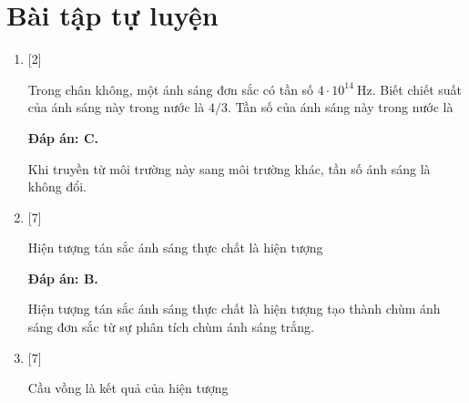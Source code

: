\section{Bài tập tự luyện}
\begin{enumerate}[label=\bfseries Câu \arabic*:]
	
	\item {} [2]
	\cauhoi
	{Trong chân không, một ánh sáng đơn sắc có tần số $4\cdot 10^{14}\ \text {Hz}$. Biết chiết suất của ánh sáng này trong nước là $4/3$. Tần số của ánh sáng này trong nước là
	}
	
	\loigiai
	{		\textbf{Đáp án: C.}
		
		Khi truyền từ môi trường này sang môi trường khác, tần số ánh sáng là không đổi.		
		
	}
	

	

	
	\item {} [7]
	\cauhoi
	{Hiện tượng tán sắc ánh sáng thực chất là hiện tượng
	}
	
	\loigiai
	{		\textbf{Đáp án: B.}
		
		Hiện tượng tán sắc ánh sáng thực chất là hiện tượng tạo thành chùm ánh sáng đơn sắc từ sự phân tích chùm ánh sáng trắng.
		
	}
	
	\item {} [7]
	\cauhoi
	{Cầu vồng là kết quả của hiện tượng
	}
	

\end{enumerate}
